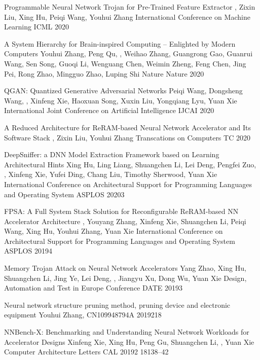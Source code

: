 

{Programmable Neural Network Trojan for Pre-Trained Feature Extractor}
{, Zixin Liu, Xing Hu, Peiqi Wang, Youhui Zhang}
{International Conference on Machine Learning}
{ICML}
{2020}

{A System Hierarchy for Brain-inspired Computing -- Enlighted by Modern Computers}
{Youhui Zhang, Peng Qu, , Weihao Zhang, Guangrong Gao, Guanrui Wang, Sen Song, Guoqi Li, Wenguang Chen, Weimin Zheng, Feng Chen, Jing Pei, Rong Zhao, Mingguo Zhao, Luping Shi}
{Nature}
{Nature}
{2020}

{QGAN: Quantized Generative Adversarial Networks}
{Peiqi Wang, Dongsheng Wang, , Xinfeng Xie, Haoxuan Song, Xuxin Liu, Yongqiang Lyu, Yuan Xie}
{International Joint Conference on Artificial Intelligence}
{IJCAI}
{2020}

{A Reduced Architecture for ReRAM-based Neural Network Accelerator and Its Software Stack}
{, Zixin Liu, Youhui Zhang}
{Transcations on Computers}
{TC}
{2020}

{DeepSniffer: a DNN Model Extraction Framework based on Learning Architectural Hints}
{Xing Hu, Ling Liang, Shuangchen Li, Lei Deng, Pengfei Zuo, , Xinfeng Xie, Yufei Ding, Chang Liu, Timothy Sherwood, Yuan Xie}
{International Conference on Architectural Support for Programming Languages and Operating System}
{ASPLOS}
{2020}{3}

{FPSA: A Full System Stack Solution for Reconfigurable ReRAM-based NN Accelerator Architecture}
{, Youyang Zhang, Xinfeng Xie, Shuangchen Li, Peiqi Wang, Xing Hu, Youhui Zhang, Yuan Xie}
{International Conference on Architectural Support for Programming Languages and Operating System}
{ASPLOS}
{2019}{4}

{Memory Trojan Attack on Neural Network Accelerators}
{Yang Zhao, Xing Hu, Shuangchen Li, Jing Ye, Lei Deng, , Jiangyu Xu, Dong Wu, Yuan Xie}
{Design, Automation and Test in Europe Conference}
{DATE}
{2019}{3}

{Neural network structure pruning method, pruning device and electronic equipment}
{Youhui Zhang, }
{CN109948794A}
{2019}{2}{18}

{NNBench-X: Benchmarking and Understanding Neural Network Workloads for Accelerator Designs}
{Xinfeng Xie, Xing Hu, Peng Gu, Shuangchen Li, , Yuan Xie}
{Computer Architecture Letters}
{CAL}
{2019}{2}
{18}{1}{38--42}


